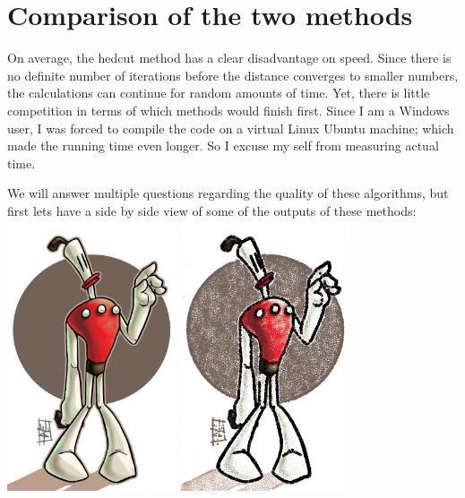 \documentclass[11pt]{article}
\begin{document}
\newpage\section{Comparison of the two methods}
On average, the hedcut method has a clear disadvantage on speed. Since there is no definite number of iterations before the distance converges to smaller numbers, the calculations can continue for random amounts of time. Yet, there is little competition in terms of which methods would finish first. Since I am a Windows user, I was forced to compile the code on a virtual Linux Ubuntu machine; which made the running time even longer. So I excuse my self from measuring actual time. 

We will answer multiple questions regarding the quality of these algorithms, but first lets have a side by side view of some of the outputs of these methods:
\newline\includegraphics[width=5cm, height=8cm]{klaymen.png} 
\includegraphics[width=5cm, height=8cm]{klaymen-hedcut-20000.png}
\end{document}
